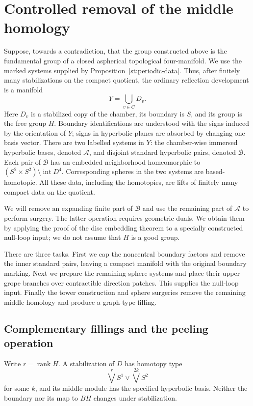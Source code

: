 \section{Controlled removal of the middle homology}\label{ct:section}

Suppose, towards a contradiction, that the group constructed above is the
fundamental group of a closed aspherical topological four-manifold.  We use
the marked systems supplied by Proposition~\ref{st:periodic-data}.  Thus,
after finitely many stabilizations on the compact quotient, the ordinary
reflection development is a manifold
\[
                 Y=\bigcup_{v\in C}D_v.
\]
Here $D_v$ is a stabilized copy of the chamber, its boundary is $S$, and
its group is the free group $H$.  Boundary identifications are understood
with the signs induced by the orientation of $Y$; signs in hyperbolic
planes are absorbed by changing one basis vector.  There are two
labelled systems in $Y$:
the chamber-wise immersed hyperbolic bases, denoted $\mathcal A$, and
disjoint standard hyperbolic pairs, denoted $\mathcal B$.  Each pair of
$\mathcal B$ has an embedded neighborhood homeomorphic to
$(S^2\times S^2)\setminus\operatorname{int}D^4$.  Corresponding spheres in
the two systems are based-homotopic.  All these data, including the
homotopies, are lifts of finitely many compact data on the quotient.

We will remove an expanding finite part of $\mathcal B$ and use the
remaining part of $\mathcal A$ to perform surgery.  The latter operation
requires geometric duals.  We obtain them by applying the proof of the
disc embedding theorem to a specially constructed null-loop input;
we do not assume that $H$ is a good group.

There are three tasks. First we cap the noncentral boundary factors and
remove the inner standard pairs, leaving a compact manifold with the
original boundary marking. Next we prepare the remaining sphere
systems and place their upper grope branches over contractible
direction patches. This supplies the null-loop input. Finally the
tower construction and sphere surgeries remove the remaining middle
homology and produce a graph-type filling.

\subsection{Complementary fillings and the peeling operation}

Write $r=\operatorname{rank}H$.  A stabilization of $D$ has homotopy type
\[
        \bigvee^r S^1\vee\bigvee^{2k}S^2
\]
for some $k$, and its middle module has the specified hyperbolic basis.
Neither the boundary nor its map to $BH$ changes under stabilization.


